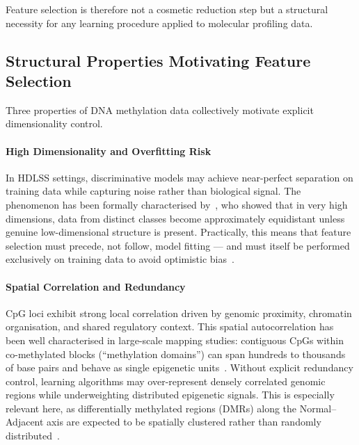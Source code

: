 Feature selection is therefore not a cosmetic reduction step but a structural 
necessity for any learning procedure applied to molecular profiling data.

\subsection{Structural Properties Motivating Feature Selection}

Three properties of DNA methylation data collectively motivate explicit 
dimensionality control.

\paragraph{High Dimensionality and Overfitting Risk}
In HDLSS settings, discriminative models may achieve near-perfect separation 
on training data while capturing noise rather than biological signal. The 
phenomenon has been formally characterised by~\cite{Hall2005}, who showed 
that in very high dimensions, data from distinct classes become approximately 
equidistant unless genuine low-dimensional structure is present. Practically, 
this means that feature selection must precede, not follow, model fitting — 
and must itself be performed exclusively on training data to avoid 
optimistic bias~\cite{Ambroise2002}.

\paragraph{Spatial Correlation and Redundancy}
CpG loci exhibit strong local correlation driven by genomic proximity, 
chromatin organisation, and shared regulatory context. This spatial 
autocorrelation has been well characterised in large-scale mapping studies: 
contiguous CpGs within co-methylated blocks (``methylation domains'') 
can span hundreds to thousands of base pairs and behave as single 
epigenetic units~\cite{Hansen2011, Aryee2014}. Without explicit redundancy 
control, learning algorithms may over-represent densely correlated genomic 
regions while underweighting distributed epigenetic signals. This is 
especially relevant here, as differentially methylated regions (DMRs) 
along the Normal–Adjacent axis are expected to be spatially clustered 
rather than randomly distributed~\cite{Luo2018}.

